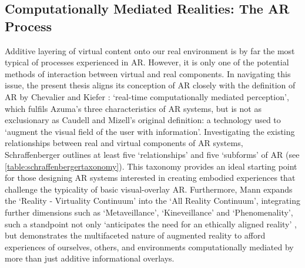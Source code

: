 \subsection{Computationally Mediated Realities: The AR Process}\label{sec: literature-interface-process}
Additive layering of virtual content onto our real environment is by far the most typical of processes experienced in AR. However, it is only one of the potential methods of interaction between virtual and real components. In navigating this issue, the present thesis aligns its conception of AR closely with the definition of AR by Chevalier and Kiefer \citeyearpar{chevalier2020}: `real-time computationally mediated perception', which fulfils Azuma's three characteristics of AR systems, but is not as exclusionary as Caudell and Mizell's original definition: a technology used to  `augment the visual field of the user with information'. Investigating the existing relationships between real and virtual components of AR systems, Schraffenberger outlines at least five `relationships' and five `subforms' of AR (see \autoref{table:schraffenbergertaxonomy}). This taxonomy \citeyearpar[pp. 80-130]{schraffenberger2018} provides an ideal starting point for those designing AR systems interested in creating embodied experiences that challenge the typicality of basic visual-overlay AR. Furthermore, Mann expands the `Reality - Virtuality Continuum' \citep{milgram1994} into the `All Reality Continuum', integrating further dimensions such as `Metaveillance', `Kineveillance' and `Phenomenality', such a standpoint not only `anticipates the need for an ethically aligned reality' \citeyearpar{mann2018}, but demonstrates the multifaceted nature of augmented reality to afford experiences of ourselves, others, and environments computationally mediated by more than just additive informational overlays.

